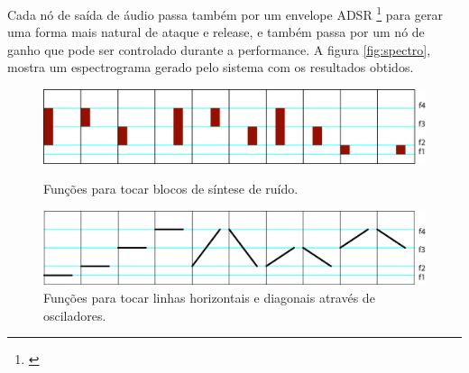 
Cada nó de saída de áudio passa também por um envelope ADSR \footnote{\cite{Lee2016}} para gerar uma forma mais natural de ataque e release, e também passa por um nó de ganho que pode ser controlado durante a performance. A figura \ref{fig:spectro}, mostra um espectrograma gerado pelo sistema com os resultados obtidos.


\begin{figure}
    
        \includegraphics[width=1\textwidth]{pictures/audiotype_v1_noise}
        \vspace{-10pt}
    \caption{Funções para tocar blocos de síntese de ruído.}
    \vspace{10pt}
    \label{fig:noise}
        
        \includegraphics[width=1\textwidth]{pictures/audiotype_v1_sine}
    \caption{Funções para tocar linhas horizontais e diagonais através de osciladores.}
    \vspace{-10pt}
    \label{fig:sine}
\vspace{10pt}
\end{figure}

